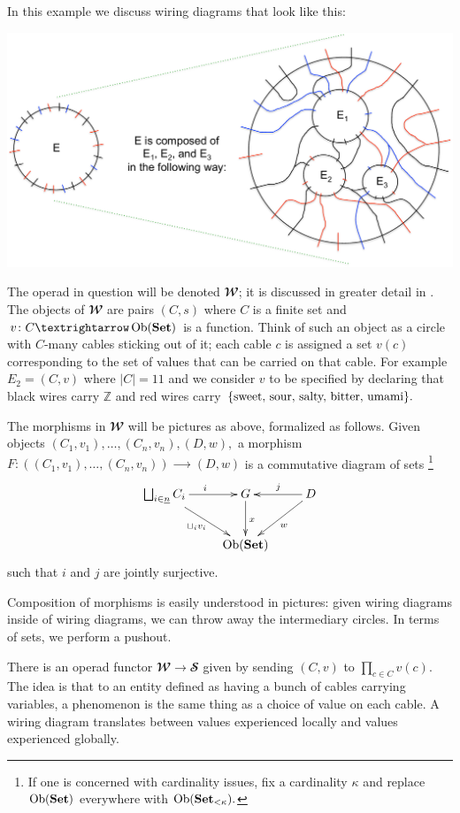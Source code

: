 \documentclass[../main/CT4S-EN-RU]{subfiles}
\begin{document}
\begin{exampleENG}
In this example we discuss wiring diagrams that look like this:
\begin{center}
\includegraphics[width=\textwidth]{wiringDiagram}
\end{center}
The operad in question will be denoted ${𝓦}$; it is discussed in greater detail in \cite{Sp4}. The objects of ${𝓦}$ are pairs $(C,s)$ where $C$ is a finite set and $v\colon C{→}\Ob(\Set)$ is a function. Think of such an object as a circle with $C$-many cables sticking out of it; each cable $c$ is assigned a set $v(c)$ corresponding to the set of values that can be carried on that cable. For example $E_2=(C,v)$ where $|C|=11$ and we consider $v$ to be specified by declaring that black wires carry ${ℤ}$ and red wires carry $\{\textnormal{sweet, sour, salty, bitter, umami}\}.$ 

The morphisms in ${𝓦}$ will be pictures as above, formalized as follows. Given objects $(C_1,v_1),\ldots,(C_n,v_n), (D,w),$ a morphism $F\colon((C_1,v_1),\ldots,(C_n,v_n)){⟶} (D,w)$ is a commutative diagram of sets
\footnote{If one is concerned with cardinality issues, fix a cardinality $\kappa$ and replace $\operatorname{Ob}({\mathbf{Set}})$ everywhere with $\operatorname{Ob}({\mathbf{Set}}_{<\kappa}).$} 
$$
\xymatrix{\bigsqcup_{i\in\underline{n}}C_i\ar[rd]_{\sqcup_iv_i}\ar[r]^i&G\ar[d]^x&D\ar[l]_j\ar[ld]^w\\&\Ob(\Set)}
$$
such that $i$ and $j$ are jointly surjective.

Composition of morphisms is easily understood in pictures: given wiring diagrams inside of wiring diagrams, we can throw away the intermediary circles. In terms of sets, we perform a pushout.

There is an operad functor ${𝓦}{→}{𝓢}$ given by sending $(C,v)$ to $\prod_{c\in C}v(c).$ The idea is that to an entity defined as having a bunch of cables carrying variables, a phenomenon is the same thing as a choice of value on each cable. A wiring diagram translates between values experienced locally and values experienced globally. 
\end{exampleENG}
\end{document}
